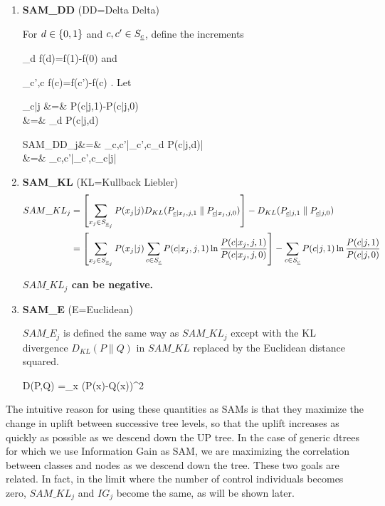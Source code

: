 \begin{enumerate}
\item{\bf SAM\_DD} (DD=Delta Delta)

For $d\in \{0,1\}$
and $c, c'\in S_{\underline{c}}$, define the increments

\beq
\partial_d f(d)=f(1)-f(0)
\eeq
and

\beq
\partial_{c',c} f(c)=f(c')-f(c)
\;.
\eeq
Let

\beqa
\Delta_{c|j} &=& P(c|j,1)-P(c|j,0)
\\
&=& \partial_d P(c|j,d)
\label{eq-delta-c-j}
\eeqa

\beqa
SAM\_DD_j&=& \max_{c,c'}|\partial_{c',c}\partial_d P(c|j,d)|
\\
&=&
\max_{c,c'}|\partial_{c',c}\Delta_{c|j}|
\eeqa

\item{\bf SAM\_KL} (KL=Kullback Liebler)
\begin{align}
SAM\_KL_j&=
\left[
\sum_{x_j\in S_{{\underline{x}}_j}}
P(x_j|j)
D_{KL}(P_{{\underline{c}}|x_j,j,1}\parallel P_{{\underline{c}}|x_j,j,0})
\right]
-
D_{KL}(P_{{\underline{c}}|j,1}\parallel P_{{\underline{c}}|j,0})
\\
&=
\left[
\sum_{x_j\in S_{{\underline{x}}_j}}
P(x_j|j)
 \sum_{c\in S_{\underline{c}}}P(c|x_j,j,1) 
\ln \frac{P(c|x_j,j,1) }{ P(c|x_j,j,0) }
\right]
-
\sum_{c\in S_{\underline{c}}} 
P(c|j,1) 
\ln \frac{P(c|j,1) }{ P(c|j,0) }
\label{eq-sam-kl}
\end{align}

{\bf $SAM\_KL_j$ can be negative.}

\item {\bf SAM\_E} (E=Euclidean)

$SAM\_E_j$ is defined the same way as $SAM\_KL_j$
except with 
the KL divergence $D_{KL}(P\parallel Q)$ 
in $SAM\_KL$ replaced 
by the Euclidean distance squared. 


\beq
D(P,Q) =\sum_x (P(x)-Q(x))^2
\eeq

\end{enumerate}

The intuitive reason for
 using these quantities as
SAMs is that they maximize the change in uplift 
between 
successive tree levels, so 
that the uplift increases as quickly as possible
as we descend down the UP tree.
In the case of generic dtrees
for which we use Information Gain as SAM, we 
are maximizing the correlation
between classes and nodes as we descend down the tree. 
These two goals are related.
In fact, in the limit
where the
number of control individuals
becomes zero,
$SAM\_KL_j$ and $IG_j$
become the same, as will be shown later.

